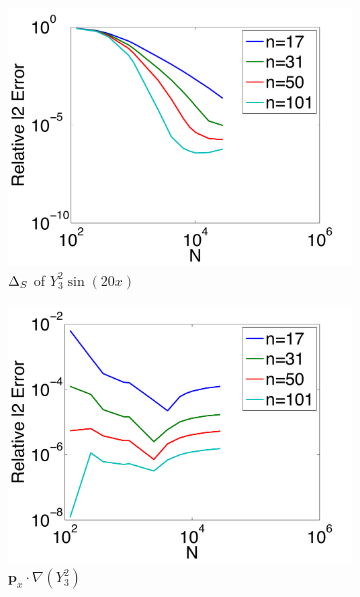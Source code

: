 \begin{figure}[htbp]
	\centering
	\begin{subfigure}[b]{0.425\textwidth}
	\includegraphics[width=1.0\textwidth]{../figures/chapter2/compare_weight_generation/lsfc_vs_px_grad_dot_px_grad/direct_rel_l2_error.pdf}
	\caption{$\LaplaceBeltrami$ of $Y_{3}^{2} \sin(20 x)$}
		\end{subfigure}
	\begin{subfigure}[b]{0.425\textwidth}
	\includegraphics[width=1.0\textwidth]{../figures/chapter2/compare_weight_generation/xsfc_vs_xsfc_alt_on_sph32/direct_rel_l2_error.pdf}
	\caption{$\mathbf{p}_{x} \cdot \nabla ( Y_{3}^{2})$ }
	\end{subfigure}
	\begin{subfigure}[b]{0.425\textwidth}

\end{subfigure}
\end{figure}
